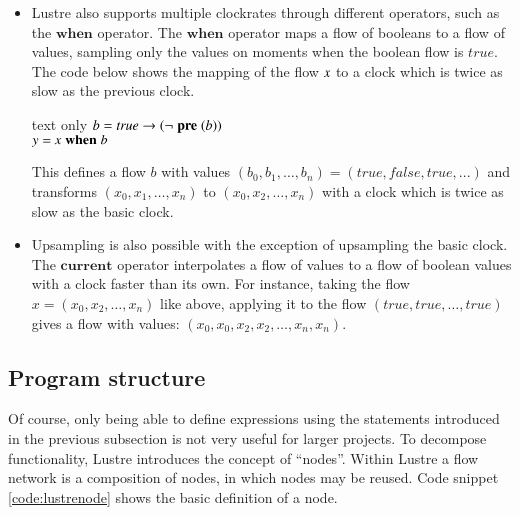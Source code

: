 \begin{itemize}
    This defines a flow named $y$, with $y_0$ having value $0$ and with every subsequent value being the sum of $x$ until that moment.
    The resulting flow would be \\

    \begin{changemargin}{1cm}{0cm}
    \begin{expansionno}{text only} 
    $y = (0,x_0,x_0+x_1,\ldots,\sum_{0}^{n} x_n)$.
    \end{expansionno}
    \end{changemargin}%

\item 
    Lustre also supports multiple clockrates through different operators, such as the \ensuremath{\textbf{when}} operator.
    The \ensuremath{\textbf{when}} operator maps a flow of booleans to a flow of values, sampling only the values on moments when the boolean flow is $true$. 
    The code below shows the mapping of the flow \ensuremath{\Varid{x}} to a clock which is twice as slow as the previous clock.\\

    \begin{changemargin}{1cm}{0cm}
    \begin{expansionno}{text only} 
    \ensuremath{\Varid{b}\mathrel{=}\Varid{true}\to (\neg \;\textbf{pre}\;(\Varid{b}))}\\
    \ensuremath{\Varid{y}\mathrel{=}\Varid{x}\;\textbf{when}\;\Varid{b}}
    \end{expansionno}
    \end{changemargin}%

    This defines a flow $b$ with values $(b_0,b_1,\ldots,b_n) = (true,false,true,...)$ and transforms $(x_0,x_1,\ldots,x_n)$ to $(x_0,x_2,\ldots,x_n)$ with a clock which is twice as slow as the basic clock.
\item 
    Upsampling is also possible with the exception of upsampling the basic clock. The \ensuremath{\textbf{current}} operator interpolates a flow of values to a flow of boolean values with a clock faster than its own.
    For instance, taking the flow $x = (x_0,x_2,\ldots,x_n)$ like above, applying it to the flow $(true,true,\ldots,true)$ gives a flow with values: $(x_0,x_0,x_2,x_2,\ldots,x_n,x_n)$.
\end{itemize}

\subsection{Program structure}
Of course, only being able to define expressions using the statements introduced in the previous subsection is not very useful for larger projects. 
To decompose functionality, Lustre introduces the concept of ``nodes''.
Within Lustre a flow network is a composition of nodes, in which nodes may be reused.
Code snippet \ref{code:lustrenode} shows the basic definition of a node.

